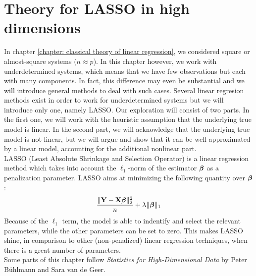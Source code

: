 \chapter{Theory for LASSO in high dimensions}
\label{chapter: LASSO}
In chapter \ref{chapter: classical theory of linear regression}, we considered square or almost-square systems (\(n \approx p\)). In this chapter however, we work with underdetermined systems, which means that we have few observations but each with many components. In fact, this difference may even be substantial and we will introduce general methods to deal with such cases. Several linear regresion methods exist in order to work for underdetermined systems but we will introduce only one, namely LASSO. Our exploration will consist of two parts. In the first one, we will work with the heuristic assumption that the underlying true model is linear. In the second part, we will acknowledge that the underlying true model is not linear, but we will argue and show that it can be well-approximated by a linear model, accounting for the additional nonlinear part. \\
LASSO (Least Absolute Shrinkage and Selection Operator) is a linear regression method which takes into account the \(\ell_1\)-norm of the estimator \(\boldsymbol{\beta}\) as a penalization parameter. LASSO aims at minimizing the following quantity over \(\boldsymbol{\beta}\):
\[
    \frac{\|\mathbf{Y}-\mathbf{X} \boldsymbol{\beta}\|_{2}^{2}}{n}+\lambda\|\boldsymbol{\beta}\|_{1}
\]
Because of the \(\ell_1\) term, the model is able to indentify and select the relevant parameters, while the other parameters can be set to zero. This makes LASSO shine, in comparison to other (non-penalized) linear regression techniques, when there is a great number of parameters. \\
Some parts of this chapter follow \textit{Statistics for High-Dimensional Data} by Peter Bühlmann and Sara van de Geer.

